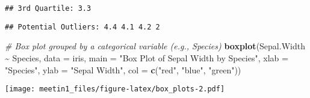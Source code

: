 \documentclass[
]{article}
\newenvironment{Shaded}{\begin{snugshade}}{\end{snugshade}}
\newcommand{\AttributeTok}[1]{\textcolor[rgb]{0.13,0.29,0.53}{#1}}
\newcommand{\CommentTok}[1]{\textcolor[rgb]{0.56,0.35,0.01}{\textit{#1}}}
\newcommand{\FunctionTok}[1]{\textcolor[rgb]{0.13,0.29,0.53}{\textbf{#1}}}
\newcommand{\NormalTok}[1]{#1}
\newcommand{\SpecialCharTok}[1]{\textcolor[rgb]{0.81,0.36,0.00}{\textbf{#1}}}
\newcommand{\StringTok}[1]{\textcolor[rgb]{0.31,0.60,0.02}{#1}}
\begin{document}
\begin{verbatim}
## 3rd Quartile: 3.3
\end{verbatim}

\begin{Shaded}
\end{Shaded}

\begin{verbatim}
## Potential Outliers: 4.4 4.1 4.2 2
\end{verbatim}

\begin{Shaded}
\begin{Highlighting}[]
\CommentTok{\# Box plot grouped by a categorical variable (e.g., Species)}
\FunctionTok{boxplot}\NormalTok{(Sepal.Width }\SpecialCharTok{\textasciitilde{}}\NormalTok{ Species, }\AttributeTok{data =}\NormalTok{ iris, }\AttributeTok{main =} \StringTok{"Box Plot of Sepal Width by Species"}\NormalTok{, }
        \AttributeTok{xlab =} \StringTok{"Species"}\NormalTok{, }\AttributeTok{ylab =} \StringTok{"Sepal Width"}\NormalTok{, }\AttributeTok{col =} \FunctionTok{c}\NormalTok{(}\StringTok{"red"}\NormalTok{, }\StringTok{"blue"}\NormalTok{, }\StringTok{"green"}\NormalTok{))}
\end{Highlighting}
\end{Shaded}

\texttt{[image: meetin1\_files/figure-latex/box\_plots-2.pdf]}
\end{document}
